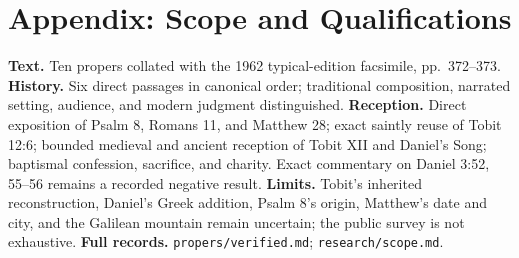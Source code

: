 
\section*{Appendix: Scope and Qualifications}

\begin{studyframe}
\textbf{Text.} Ten propers collated with the 1962 typical-edition facsimile, pp.~372--373. \textbf{History.} Six direct passages in canonical order; traditional composition, narrated setting, audience, and modern judgment distinguished. \textbf{Reception.} Direct exposition of Psalm 8, Romans 11, and Matthew 28; exact saintly reuse of Tobit 12:6; bounded medieval and ancient reception of Tobit XII and Daniel's Song; baptismal confession, sacrifice, and charity. Exact commentary on Daniel 3:52, 55--56 remains a recorded negative result. \textbf{Limits.} Tobit's inherited reconstruction, Daniel's Greek addition, Psalm 8's origin, Matthew's date and city, and the Galilean mountain remain uncertain; the public survey is not exhaustive. \textbf{Full records.} \nolinkurl{propers/verified.md}; \nolinkurl{research/scope.md}.
\end{studyframe}

